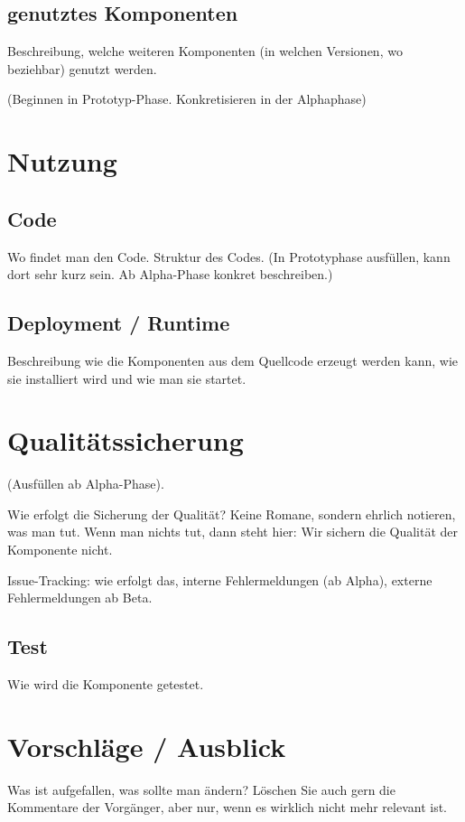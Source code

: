 \subsection{genutztes Komponenten}
Beschreibung, welche weiteren Komponenten (in welchen Versionen, wo beziehbar) genutzt werden.

(Beginnen in Prototyp-Phase. Konkretisieren in der Alphaphase)

\section{Nutzung}
\subsection{Code}
Wo findet man den Code. Struktur des Codes. (In Prototyphase ausfüllen,
kann dort sehr kurz sein. Ab Alpha-Phase konkret beschreiben.)

\subsection{Deployment / Runtime}
Beschreibung wie die Komponenten aus dem Quellcode erzeugt werden kann,
wie sie installiert wird und wie man sie startet.

\section{Qualitätssicherung}
(Ausfüllen ab Alpha-Phase).

Wie erfolgt die Sicherung der Qualität? Keine Romane, sondern ehrlich notieren,
was man tut. Wenn man nichts tut, dann steht hier: Wir sichern die Qualität der
Komponente nicht.

Issue-Tracking: wie erfolgt das, interne Fehlermeldungen (ab Alpha), 
externe Fehlermeldungen ab Beta.

\subsection{Test}
Wie wird die Komponente getestet.

\section{Vorschläge / Ausblick}
Was ist aufgefallen, was sollte man ändern? Löschen Sie auch gern die Kommentare
der Vorgänger, aber nur, wenn es wirklich nicht mehr relevant ist.

